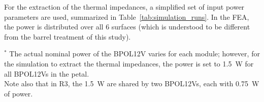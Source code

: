 For the extraction of the thermal impedances, a simplified set of input power parameters are used,
summarized in Table~\ref{tab:simulation_runs}.
In the FEA, the power is distributed over all 6 surfaces (which is understood to be different from
the barrel treatment of this study).

\let\arraystretcha\arraystretch
\renewcommand\arraystretch{1.4} %
\begin{table}[h!]
\begin{center}
\end{center}
\caption{ Description of the 3 thermal simulations required to obtain the thermal impedances.
}
\label{tab:simulation_runs}
\end{table}
\let\arraystretch\arraystretcha

$^*$ The actual nominal power of the BPOL12V varies for each module; however, for the simulation to extract
the thermal impedances, the power is set to 1.5~W for all BPOL12Vs in the petal.\\
%
Note also that in R3, the 1.5~W are shared by two BPOL12Vs, each with 0.75~W of power.




